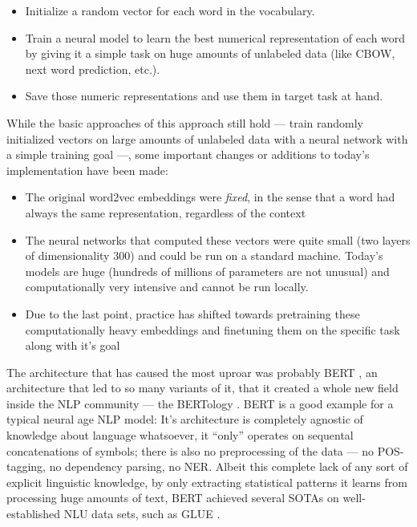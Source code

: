 \begin{itemize}
  \item Initialize a random vector for each word in the vocabulary.
  \item Train a neural model to learn the best numerical representation of each word
    by giving it a simple task on huge amounts of unlabeled data (like CBOW, next word
    prediction, etc.).
  \item Save those numeric representations and use them in target task at hand.
\end{itemize}

While the basic approaches of this approach still hold --- train randomly initialized vectors on
large amounts of unlabeled data with a neural network with a simple training goal ---, some important
changes or additions to today's implementation have been made:

\begin{itemize}
  \item The original word2vec embeddings were \emph{fixed}, in the sense that a word had always
    the same representation, regardless of the context
  \item The neural networks that computed these vectors were quite small (two layers of dimensionality
    300) and could be run on a standard machine.
    Today's models are huge (hundreds of millions of parameters are not unusual) and computationally
    very intensive and cannot be run locally.
  \item Due to the last point, practice has shifted towards pretraining these computationally heavy
    embeddings and finetuning them on the specific task along with it's goal
\end{itemize}

The architecture that has caused the most uproar was probably BERT \cite{devlin2018bert}, an
architecture that led to so many variants of it, that it created a whole new field inside the
NLP community --- the BERTology \cite{rogers2020primer}. BERT is a good example for a typical
neural age NLP model: It's architecture is completely agnostic of knowledge about language
whatsoever, it ``only'' operates on sequental concatenations of symbols; there is also no
preprocessing of the data --- no POS-tagging, no dependency parsing, no NER.
Albeit this complete lack of any sort of explicit linguistic knowledge, by only extracting
statistical patterns it learns from processing huge amounts of text, BERT achieved several
SOTAs on well-established NLU data sets, such as GLUE \cite{wang2018glue}.

